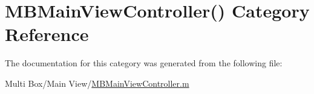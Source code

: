 \hypertarget{category_m_b_main_view_controller_07_08}{\section{M\-B\-Main\-View\-Controller() Category Reference}
\label{category_m_b_main_view_controller_07_08}
}


The documentation for this category was generated from the following file\-:\begin{DoxyCompactItemize}
\item 
Multi Box/\-Main View/\hyperlink{_m_b_main_view_controller_8m}{M\-B\-Main\-View\-Controller.\-m}\end{DoxyCompactItemize}

